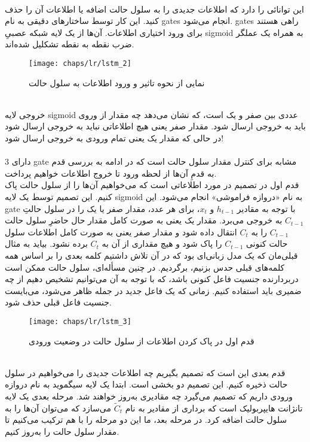 \\
 این توانائی را دارد که اطلاعات جدیدی را به سلول حالت اضافه یا اطلاعات آن را حذف کنید. این کار توسط ساختارهای دقیقی به نام \glspl{gate} انجام می‌شود. \glspl{gate}‌ راهی هستند برای ورود اختیاری اطلاعات. آن‌ها از یک لایه شبکه عصبیِ \gls{sigmoid} به همراه یک عملگر ضرب نقطه به نقطه تشکلیل شده‌اند.
 \begin{figure}[!ht]
 	\centerline{\texttt{[image: chaps/lr/lstm\_2]}}
 	\caption{
 		نمایی از نحوه تاثیر و ورود اطلاعات به سلول حالت
 	}
 	\label{fig:ch_lr:lstm_2}
 \end{figure} 
\\
 خروجی لایه \gls{sigmoid} عددی بین صفر و یک است، که نشان می‌دهد چه مقدار از وروی باید به خروجی ارسال شود. مقدار صفر یعنی هیچ اطلاعاتی نباید به خروجی ارسال شود در حالی که مقدار یک یعنی تمام ورودی به خروجی ارسال شود!
 \\
 \\
  دارای 3 \gls{gate} مشابه برای کنترل مقدار سلول حالت است که در ادامه به بررسی قدم به قدمِ آن‌ها از لحظه ورود تا خروج اطلاعات خواهیم پرداخت.
  \\
 قدم اول در  تصمیم در مورد اطلاعاتی است که می‌خواهیم آن‌ها را از سلول حالت پاک کنیم. این تصمیم توسط یک لایه \gls{sigmoid} به نام «دروازه فراموشی» انجام می‌شود. این \gls{gate} با توجه به مقادیر $h_{t-1}$ و $x_t$، برای هر عدد، مقدار صفر یا یک را در سلول حالتِ $C_{t-1}$ به خروجی می‌برد. مقدار یک یعنی به صورت کامل مقدار حال حاضرِ سلول حالت $C_{t-1}$ را به $C_t$ انتقال داده شود و مقدار صفر یعنی به صورت کامل اطلاعات سلول حالت کنونی $C_{t-1}$ را پاک شود و هیچ مقداری از آن  به $C_t$ برده نشود. بیاید به مثال قبلی‌مان که یک مدل زبانی‌ای بود که در آن تلاش داشتیم کلمه بعدی را بر اساس همه کلمه‌های قبلی حدس بزنیم، برگردیم. در چنین مسأله‌ای، سلول حالت ممکن است دربردارنده جنسیت فاعل کنونی باشد، که با توجه به آن می‌توانیم تشخیص دهیم از چه ضمیری باید استفاده کنیم. زمانی که یک فاعل جدید در جمله ظاهر می‌شود، می‌بایست جنسیت فاعل قبلی حذف شود.
 \begin{figure}[!ht]
	\centerline{\texttt{[image: chaps/lr/lstm\_3]}}
	\caption{
		قدم اول در پاک کردن اطلاعات از سلول حالت در وضعیت ورودی
	}
	\label{fig:ch_lr:lstm_3}
\end{figure} 
\\
قدم بعدی این است که تصمیم بگیریم چه اطلاعات جدیدی را می‌خواهیم در سلول حالت ذخیره کنیم. این تصمیم دو بخشی است. ابتدا یک لایه سیگموید به نام دروازه ورودی داریم که تصمیم می‌گیرد چه مقادیری به‌روز خواهند شد. مرحله بعدی یک لایه تانژانت هایپربولیک است که برداری از مقادیر به نام $\tilde{C}_t$ می‌سازد که می‌توان آن‌ها را به سلول حالت اضافه کرد. در مرحله بعد، ما این دو مرحله را با هم ترکیب می‌کنیم تا مقدار سلول حالت را به‌روز کنیم.
